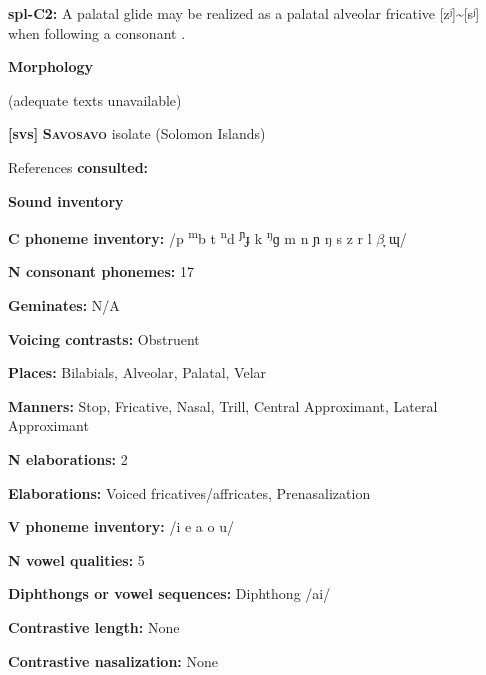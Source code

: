 \textbf{spl-C2:} A palatal glide may be realized as a palatal alveolar fricative [zʲ]{\textasciitilde}[sʲ] when following a consonant \citep{McElhanon1970}.



\textbf{Morphology}



(adequate texts unavailable)



\textbf{[svs]}   \textbf{\textsc{Savosavo}}  isolate (Solomon Islands)



References \textbf{consulted:} \citet{Wegener2008}



\textbf{Sound inventory}



\textbf{C phoneme inventory:} /p \textsuperscript{m}b t \textsuperscript{n}d \textsuperscript{ɲ}ɟ k \textsuperscript{ŋ}ɡ m n ɲ ŋ s z r l $\beta ̞$ ɰ/



\textbf{N consonant phonemes:} 17



\textbf{Geminates:} N/A



\textbf{Voicing contrasts:} Obstruent



\textbf{Places:} Bilabials, Alveolar, Palatal, Velar



\textbf{Manners:} Stop, Fricative, Nasal, Trill, Central Approximant, Lateral Approximant



\textbf{N elaborations:} 2



\textbf{Elaborations:} Voiced fricatives/affricates, Prenasalization



\textbf{V phoneme inventory:} /i e a o u/



\textbf{N vowel qualities:} 5



\textbf{Diphthongs or vowel sequences:} Diphthong /ai/



\textbf{Contrastive length:} None



\textbf{Contrastive nasalization:} None



